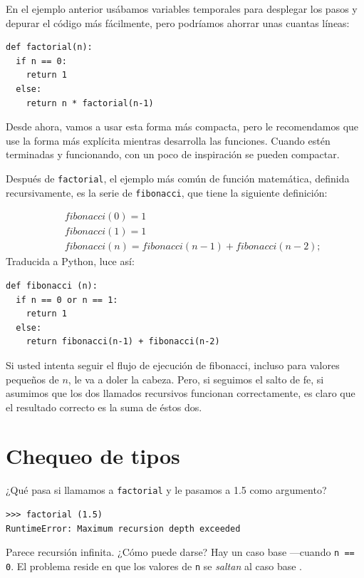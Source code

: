 \label{one more example}

En el ejemplo anterior usábamos variables temporales para desplegar
los pasos y depurar el código más fácilmente, pero podríamos ahorrar
unas cuantas líneas:

\begin{verbatim}
def factorial(n):
  if n == 0:
    return 1
  else:
    return n * factorial(n-1)
\end{verbatim}
 Desde ahora, vamos a usar esta forma más compacta, pero le recomendamos
que use la forma más explícita mientras desarrolla las funciones.
Cuando estén terminadas y funcionando, con un poco de inspiración
se pueden compactar.


Después de \texttt{factorial}, el ejemplo más común de función matemática,
definida recursivamente, es la serie de \texttt{fibonacci}, que tiene
la siguiente definición:

\vspace{-0.25in}
 
\begin{eqnarray*}
 &  & fibonacci(0)=1\\
 &  & fibonacci(1)=1\\
 &  & fibonacci(n)=fibonacci(n-1)+fibonacci(n-2);
\end{eqnarray*}
Traducida a Python, luce así:

\begin{verbatim}
def fibonacci (n):
  if n == 0 or n == 1:
    return 1
  else:
    return fibonacci(n-1) + fibonacci(n-2)
\end{verbatim}
 Si usted intenta seguir el flujo de ejecución de fibonacci, incluso
para valores pequeños de $n$, le va a doler la cabeza. Pero, si seguimos
el salto de fe, si asumimos que los dos llamados recursivos funcionan
correctamente, es claro que el resultado correcto es la suma de éstos
dos.

\section{Chequeo de tipos}

  

¿Qué pasa si llamamos a \texttt{factorial} y le pasamos a 1.5 como
argumento?

\begin{verbatim}
>>> factorial (1.5)
RuntimeError: Maximum recursion depth exceeded
\end{verbatim}
 Parece recursión infinita. ¿Cómo puede darse? Hay un caso base —cuando
\texttt{n == 0}. El problema reside en que los valores de \texttt{n}
se {\em saltan} al caso base .

